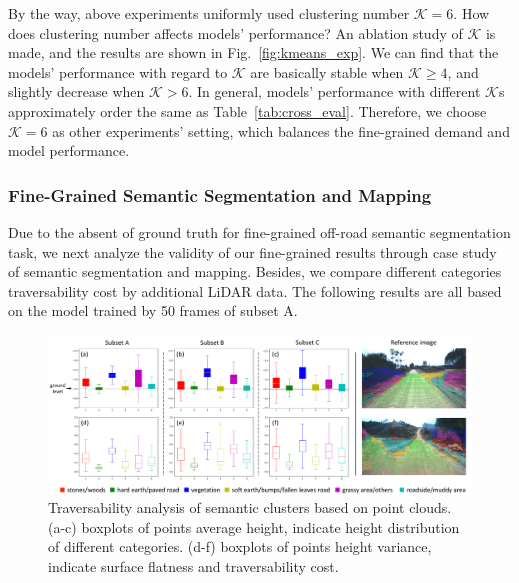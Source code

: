 \documentclass[letterpaper, 10 pt, conference]{ieeeconf}  %
\begin{document}
By the way, above experiments uniformly used clustering number $\mathcal{K}=6$. How does clustering number affects models' performance? An ablation study of $\mathcal{K}$ is made, and the results are shown in Fig.~\ref{fig:kmeans_exp}. We can find that the models' performance with regard to $\mathcal{K}$ are basically stable when $\mathcal{K} \geq 4$, and slightly decrease when $\mathcal{K}>6$. In general, models' performance with different $\mathcal{K}$s approximately order the same as Table~\ref{tab:cross_eval}. Therefore, we choose $\mathcal{K}=6$ as other experiments' setting, which balances the fine-grained demand and model performance.


\subsubsection{Fine-Grained Semantic Segmentation and Mapping}

Due to the absent of ground truth for fine-grained off-road semantic segmentation task, we next analyze the validity of our fine-grained results through case study of semantic segmentation and mapping. Besides, we compare different categories traversability cost by additional LiDAR data. The following results are all based on the model trained by 50 frames of subset A.

\begin{figure}[]
	\centering
	\includegraphics[width=\textwidth]{lidar_analysis.pdf}
	\caption{Traversability analysis of semantic clusters based on point clouds. (a-c) boxplots of points average height, indicate height distribution of different categories. (d-f) boxplots of points height variance, indicate surface flatness and traversability cost. }
	\label{fig:lidar_analysis}
	\vspace{-5mm}
\end{figure}
\end{document}
